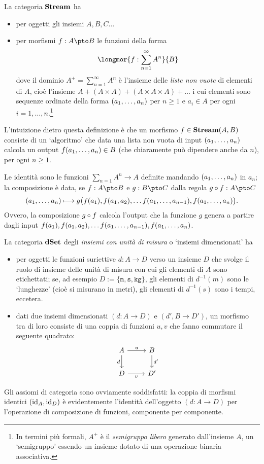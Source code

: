 \begin{example}\label{example_streams}
	La categoria \(\mathbf{Stream}\) ha
	\begin{itemize}
		\item per oggetti gli insiemi \(A,B,C\dots\)
		\item per morfismi \(f : A\pto B\) le funzioni della forma
		      \[\longmor{f : \sum_{n=1}^\infty A^n}{B}\]
		      dove il dominio \(A^+=\sum_{n=1}^\infty A^n\) è l'insieme delle \emph{liste non vuote} di elementi di \(A\), cioè l'insieme \(A + (A\times A) + (A\times A\times A) + \dots\) i cui elementi sono sequenze ordinate della forma \((\tup an,)\) per \(n\ge 1\) e \(a_i\in A\) per ogni \(i=1,\dots,n\).\footnote{In termini più formali, \(A^+\) è il \emph{semigruppo libero} generato dall'insieme \(A\), un `semigruppo' essendo un insieme dotato di una operazione binaria associativa.}
	\end{itemize}
	L'intuizione dietro questa definizione è che un morfismo \(f \in \mathbf{Stream}(A,B)\) consiste di un `algoritmo' che data una lista non vuota di input \((\tup an,)\) calcola un output \(f(\tup an,)\in B\) (che chiaramente può dipendere anche da \(n\)), per ogni \(n\ge 1\).

	Le identità sono le funzioni \(\sum_{n=1} A^n\to A\) definite mandando \((\tup an,)\) in \(a_n\); la composizione è data, se \(f : A\pto B\) e \(g : B\pto C\) dalla regola \(g\cmp f : A\pto C\)
	\[(\tup an,)\longmapsto g\big(f(a_1),f(a_1,a_2),\dots f(\tup a{n-1},),f(\tup an,)\big).\]
	Ovvero, la composizione \(g\circ f\) calcola l'output che la funzione \(g\) genera a partire dagli input \(f(a_1),f(a_1,a_2),\dots f(\tup a{n-1},),f(\tup an,)\).
\end{example}
\begin{example}\label{example_dimensionati}
	La categoria \(\mathbf{dSet}\) degli \emph{insiemi con unità di misura} o `insiemi dimensionati' ha
	\begin{itemize}
    \item per oggetti le funzioni suriettive \(d : A\to D\) verso un insieme \(D\) che svolge il ruolo di insieme delle unità di misura con cui gli elementi di \(A\) sono etichettati; se, ad esempio \(D := \{\texttt{m},\texttt{s},\texttt{kg}\}\), gli elementi di \(d^{-1}(m)\) sono le `lunghezze' (cioè si misurano in metri), gli elementi di \(d^{-1}(s)\) sono i tempi, eccetera.
		\item dati due insiemi dimensionati \((d : A\to D)\) e \((d', B\to D')\), un morfismo tra di loro consiste di una coppia di funzioni \(u,v\) che fanno commutare il seguente quadrato:
		      \[\begin{tikzcd}
				      A\ar[r, "u"]\ar[d,"d"'] & B \ar[d, "d'"]\\
				      D \ar[r, "v"']& D'
			      \end{tikzcd}\]
	\end{itemize}
  Gli assiomi di categoria sono ovviamente soddisfatti: la coppia di morfismi identici $(\mathrm{id}_A,\mathrm{id}_D)$ è evidentemente l'identità dell'oggetto $(d : A\to D)$ per l'operazione di composizione di funzioni, componente per componente.
\end{example}

